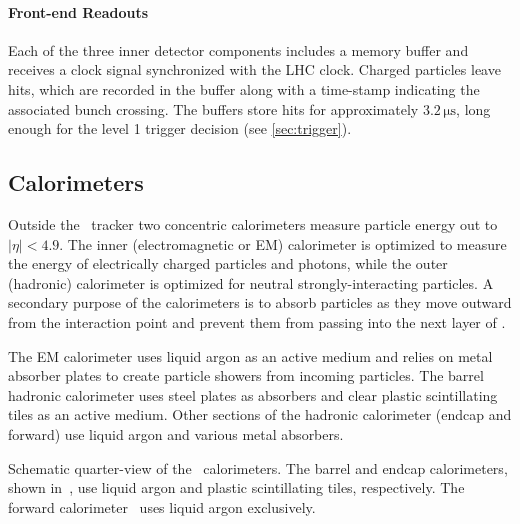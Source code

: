 \paragraph{Front-end Readouts} Each of the three inner detector components includes a memory buffer and receives a clock signal synchronized with the LHC clock.
Charged particles leave hits, which are recorded in the buffer along with a time-stamp indicating the associated bunch crossing.
The buffers store hits for approximately $3.2\,\mathrm{\mu s}$, long enough for the level 1 trigger decision (see \cref{sec:trigger}).



\subsection{Calorimeters}
\label{sec:atlas-calo}
Outside the \atlas\ tracker two concentric calorimeters measure particle energy out to $|\eta| < 4.9$.
The inner (electromagnetic or EM) calorimeter is optimized to measure the energy of electrically charged particles and photons, while the outer (hadronic) calorimeter is optimized for neutral strongly-interacting particles.
A secondary purpose of the calorimeters is to absorb particles as they move outward from the interaction point and prevent them from passing into the next layer of \atlas.

The EM calorimeter uses liquid argon as an active medium and relies on metal absorber plates to create particle showers from incoming particles.
The barrel hadronic calorimeter uses steel plates as absorbers and clear plastic scintillating tiles as an active medium.
Other sections of the hadronic calorimeter (endcap and forward) use liquid argon and various metal absorbers.

\begin{cfig}
  \caption[Atlas calorimeter quarter-view]{Schematic quarter-view of the \atlas\ calorimeters. The barrel and endcap calorimeters, shown in~, use liquid argon and plastic scintillating tiles, respectively. The forward calorimeter~ uses liquid argon exclusively.}
  \label{fig:atlas-calos-quarter}
\end{cfig}


